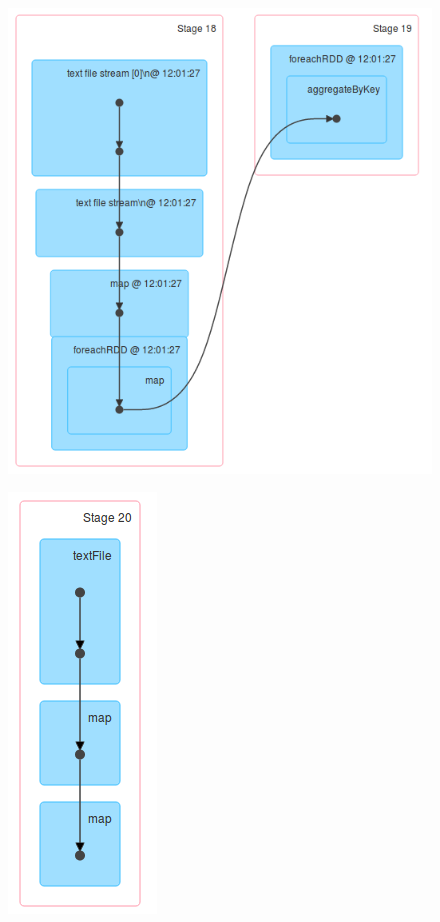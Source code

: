 \documentclass{l4proj}
\begin{document}
\begin{figure}[H]
\centering
\begin{minipage}{.5\textwidth}
  \centering
  \includegraphics[width=.75\linewidth]{images/DAG3}
  \label{fig:dag3}
\end{minipage}%
\begin{minipage}{.5\textwidth}
  \centering
  \includegraphics[width=0.29\linewidth]{images/DAG4}
  \label{fig:gag4}
\end{minipage}
\end{figure}
\end{document}

